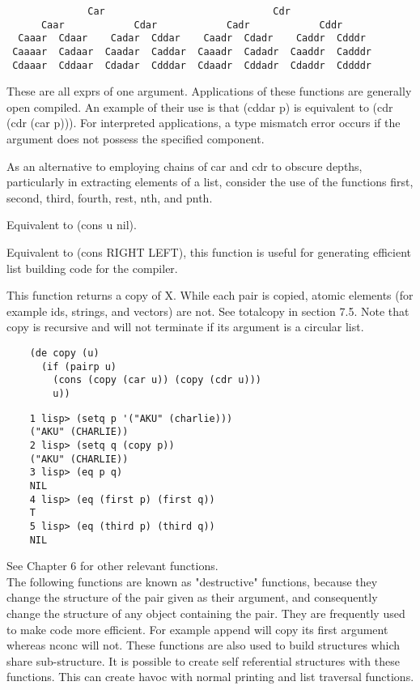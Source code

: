 \begin{verbatim}
              Car                             Cdr
      Caar            Cdar            Cadr            Cddr
  Caaar  Cdaar    Cadar  Cddar    Caadr  Cdadr    Caddr  Cdddr
 Caaaar  Cadaar  Caadar  Caddar  Caaadr  Cadadr  Caaddr  Cadddr
 Cdaaar  Cddaar  Cdadar  Cdddar  Cdaadr  Cddadr  Cdaddr  Cddddr
\end{verbatim}
    These  are all exprs of one argument.  Applications of these
    functions are generally open compiled.  An example of  their
    use  is that (cddar p) is equivalent to (cdr (cdr (car p))).
    For interpreted applications, a type mismatch  error  occurs
    if the argument does not possess the specified component.

As  an  alternative  to  employing  chains  of  car and cdr to
obscure depths, particularly in extracting elements of  a  list,
consider  the use of the functions first, second, third, fourth,
rest, nth, and pnth.


{    Equivalent to (cons u nil).
}

{    Equivalent to (cons RIGHT LEFT), this function is useful for
    generating efficient list building code for the compiler.
}

{    This function returns a copy of  X.    While  each  pair  is
    copied,  atomic  elements  (for  example  ids,  strings, and
    vectors) are not.  See totalcopy in section 7.5.  Note  that
    copy  is recursive and will not terminate if its argument is
    a circular list.
}
\begin{verbatim}
    (de copy (u)
      (if (pairp u)
        (cons (copy (car u)) (copy (cdr u)))
        u))
\end{verbatim}
\begin{verbatim}
    1 lisp> (setq p '("AKU" (charlie)))
    ("AKU" (CHARLIE))
    2 lisp> (setq q (copy p))
    ("AKU" (CHARLIE))
    3 lisp> (eq p q)
    NIL
    4 lisp> (eq (first p) (first q))
    T
    5 lisp> (eq (third p) (third q))
    NIL
\end{verbatim}
  See Chapter 6 for other relevant functions.\\

\noindent
The following functions are known as "destructive"  functions,
because  they  change  the  structure of the pair given as their
argument, and consequently change the structure  of  any  object
containing the pair.  They are frequently used to make code more
efficient.    For  example  append  will copy its first argument
whereas nconc will not.  These functions are also used to  build
structures  which share sub-structure.  It is possible to create
self referential structures with  these  functions.    This  can
create havoc with normal printing and list traversal functions.


